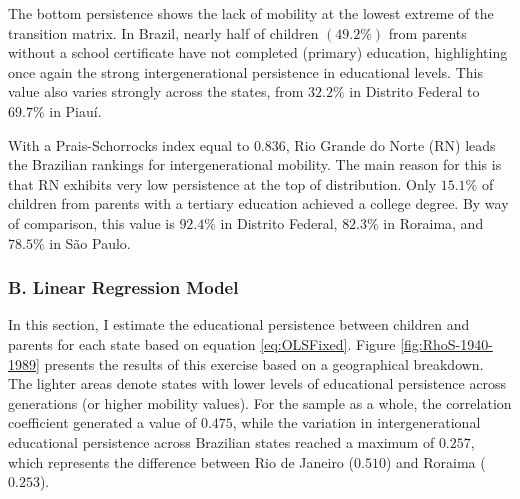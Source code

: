 \documentclass[a4paper, 12pt]{article}
\begin{document}
The bottom persistence shows the lack of mobility at the lowest extreme of the transition matrix. In Brazil, nearly half of children $(49.2\%)$ from parents without a school certificate have not completed (primary) education, highlighting once again the strong intergenerational persistence in educational levels. This value also varies strongly across the states, from $32.2\%$ in Distrito Federal to $69.7\%$ in Piauí. 


With a Prais-Schorrocks index equal to $0.836$, Rio Grande do Norte (RN) leads the Brazilian rankings for intergenerational mobility. The main reason for this is that RN exhibits very low persistence at the top of distribution. Only $15.1\%$ of children from parents with a tertiary education achieved a college degree. By way of comparison, this value is $92.4\%$ in Distrito Federal, $82.3\%$ in Roraima, and $78.5\%$ in São Paulo.



 






\subsubsection*{B. Linear Regression Model}

In this section, I estimate the educational persistence between children and parents for each state based on equation \eqref{eq:OLSFixed}. Figure \ref{fig:RhoS-1940-1989} presents the results of this exercise based on a geographical breakdown. The lighter areas denote states with lower levels of educational persistence across generations (or higher mobility values). For the sample as a whole, the correlation coefficient generated a value of $0.475$, while the variation in intergenerational educational persistence across Brazilian states reached a maximum of $0.257$, which represents the difference between Rio de Janeiro ($0.510$) and Roraima ($0.253$). 
\end{document}
